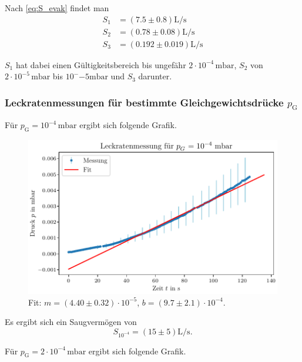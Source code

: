 Nach \eqref{eq:S_evak} findet man
\begin{align}
    S_1 &= (\num{7.5} \pm \num{0.8}) \si{\liter\per\second} \\
    S_2 &= (\num{0.78} \pm \num{0.08}) \si{\liter\per\second} \\
    S_3 &= (\num{0.192} \pm \num{0.019}) \si{\liter\per\second} 
\end{align}

$S_1$ hat dabei einen Gültigkeitsbereich bis ungefähr $\num{2}\cdot 10^{-4} \, \si{\milli\bar}$, $S_2$ von $\num{2}\cdot 10^{-5} \, \si{\milli\bar}$ bis $10^-{-5} \si{\milli\bar}$ und $S_3$ darunter.

\subsubsection{Leckratenmessungen für bestimmte Gleichgewichtsdrücke $p_\text{G}$}

Für $p_\text{G} = 10^{-4} \, \si{\milli\bar}$ ergibt sich folgende Grafik.

\begin{figure}[H]
    \centering
    \includegraphics[width=\textwidth]{plots/TP_Leck_1e4.pdf}
    \caption{Fit: $m = (\num{4.40} \pm \num{0.32}) \cdot 10^{-5}$, $b = (\num{9.7} \pm \num{2.1}) \cdot 10^{-4}$.}
    \label{fig:TP_Leck_1e4}
\end{figure}

Es ergibt sich ein Saugvermögen von
\begin{equation}
    S_{10^{-4}} = (\num{15} \pm \num{5}) \si{\liter\per\second}.
\end{equation}

Für $p_\text{G} = 2 \cdot 10^{-4} \, \si{\milli\bar}$ ergibt sich folgende Grafik.

